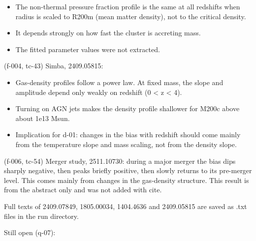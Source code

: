 \documentclass[11pt,a4paper]{article}
\begin{document}
\begin{itemize}
  \item The non-thermal pressure fraction profile is the same at all redshifts when radius is scaled to R200m (mean matter density), not to the critical density.
  \item It depends strongly on how fast the cluster is accreting mass.
  \item The fitted parameter values were not extracted.
\end{itemize}
(f-004, tc-43) Simba, 2409.05815:

\begin{itemize}
  \item Gas-density profiles follow a power law. At fixed mass, the slope and amplitude depend only weakly on redshift (0 \textless{} z \textless{} 4).
  \item Turning on AGN jets makes the density profile shallower for M200c above about 1e13 Msun.
  \item Implication for d-01: changes in the bias with redshift should come mainly from the temperature slope and mass scaling, not from the density slope.
\end{itemize}
(f-006, tc-54) Merger study, 2511.10730: during a major merger the bias dips sharply negative, then peaks briefly positive, then slowly returns to its pre-merger level. This comes mainly from changes in the gas-density structure. This result is from the abstract only and was not added with cite.

Full texts of 2409.07849, 1805.00034, 1404.4636 and 2409.05815 are saved as .txt files in the run directory.

Still open (q-07):
\end{document}
